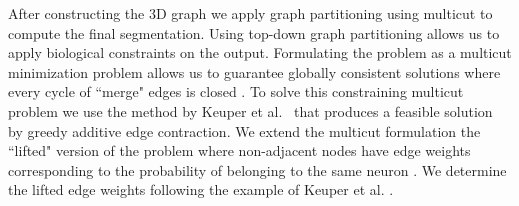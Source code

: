 After constructing the 3D graph we apply graph partitioning using multicut to compute the final segmentation. 
Using top-down graph partitioning allows us to apply biological constraints on the output. 
Formulating the problem as a multicut minimization problem allows us to guarantee  globally consistent solutions where every cycle of ``merge" edges is closed .
To solve this constraining multicut problem we use the method by Keuper et al.~\cite{keuper2015efficient} that produces a feasible solution by greedy additive edge contraction.
We extend the multicut formulation the ``lifted" version of the problem where non-adjacent nodes have edge weights corresponding to the probability of belonging to the same neuron .
We determine the lifted edge weights following the example of Keuper et al. \cite{keuper2015efficient}.
